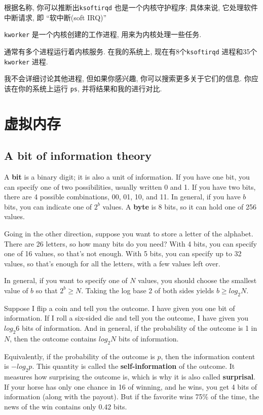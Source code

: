 \documentclass[12pt]{book}
\begin{document}
{根据名称, 你可以推断出{\tt ksoftirqd} 也是一个内核守护程序;
具体来说, 它处理软件中断请求, 即 ``软中断(soft IRQ)''

{\tt kworker} 是一个内核创建的工作进程, 用来为内核处理一些任务.

通常有多个进程运行着内核服务.
在我的系统上, 现在有8个{\tt ksoftirqd} 进程和35个{\tt kworker} 进程.

我不会详细讨论其他进程, 但如果你感兴趣, 
你可以搜索更多关于它们的信息.
你应该在你的系统上运行 {\tt ps}, 并将结果和我的进行对比.



\chapter{虚拟内存}

\section{A bit of information theory}

A {\bf bit} is a binary digit; it is also a unit of information.  If you
have one bit, you can specify one of two possibilities, usually
written 0 and 1.  If you have two bits, there are 4 possible
combinations, 00, 01, 10, and 11.  In general, if you have $b$ bits, you
can indicate one of $2^b$ values.  A {\bf byte} is 8 bits, so it can
hold one of 256 values.

Going in the other direction, suppose you want to store a letter
of the alphabet.  There are 26 letters, so how many bits do you
need?  With 4 bits, you can specify one of 16 values, so that's
not enough.  With 5 bits, you can specify up to 32 values, so
that's enough for all the letters, with a few values left over.

In general, if you want to specify one of $N$ values, you should
choose the smallest value of $b$ so that $2^b \ge N$.  Taking the
log base 2 of both sides yields $b \ge log_2 N$.

Suppose I flip a coin and tell you the outcome.  I have given
you one bit of information.  If I roll a six-sided die and tell
you the outcome, I have given you $log_2 6$ bits of information.
And in general, if the probability of the outcome is 1 in $N$,
then the outcome contains $log_2 N$ bits of information.

Equivalently, if the probability of the outcome is $p$, then
the information content is $-log_2 p$.  This quantity is called
the {\bf self-information} of the outcome.  It measures
how surprising the outcome is, which is why it is also called
{\bf surprisal}.  If your horse has only one chance in 16 of winning,
and he wins, you get 4 bits of information (along with the
payout).  But if the favorite wins 75\% of the time, the news
of the win contains only 0.42 bits.

}
\end{document}
